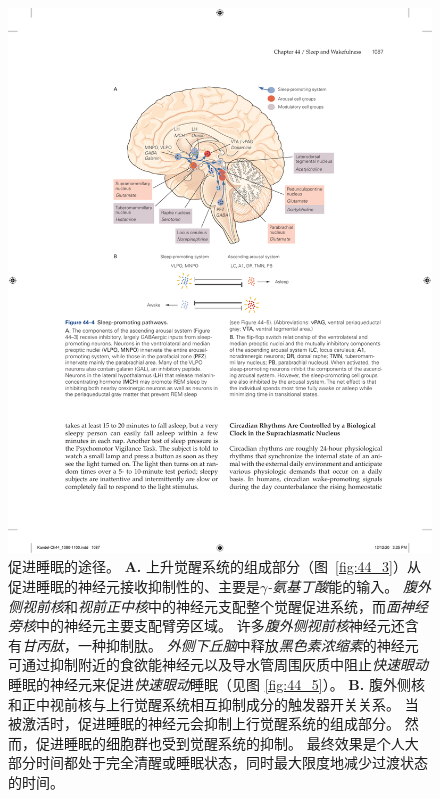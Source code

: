 \begin{figure}[htbp]
	\centering
	\includegraphics[width=0.7\linewidth]{chap44/fig_44_4}
	\caption{促进睡眠的途径。
		\textbf{A.} 上升觉醒系统的组成部分（图~\ref{fig:44_3}）从促进睡眠的神经元接收抑制性的、主要是\textit{$\gamma$-氨基丁酸}能的输入。
		\textit{腹外侧视前核}和\textit{视前正中核}中的神经元支配整个觉醒促进系统，而\textit{面神经旁核}中的神经元主要支配臂旁区域。
		许多\textit{腹外侧视前核}神经元还含有\textit{甘丙肽}，一种抑制肽。
		\textit{外侧下丘脑}中释放\textit{黑色素浓缩素}的神经元可通过抑制附近的食欲能神经元以及导水管周围灰质中阻止\textit{快速眼动}睡眠的神经元来促进\textit{快速眼动}睡眠（见图 \ref{fig:44_5}）。
		\textbf{B.} 腹外侧核和正中视前核与上行觉醒系统相互抑制成分的触发器开关关系。
		当被激活时，促进睡眠的神经元会抑制上行觉醒系统的组成部分。
		然而，促进睡眠的细胞群也受到觉醒系统的抑制。
		最终效果是个人大部分时间都处于完全清醒或睡眠状态，同时最大限度地减少过渡状态的时间。}
	\label{fig:44_4}
\end{figure}


